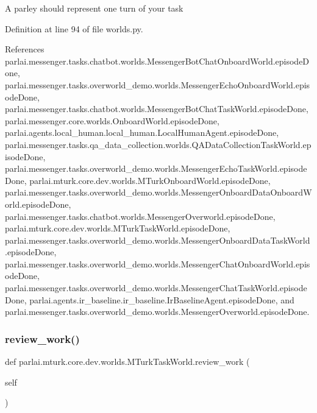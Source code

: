 \begin{DoxyVerb}A parley should represent one turn of your task\end{DoxyVerb}
 

Definition at line 94 of file worlds.\+py.



References parlai.\+messenger.\+tasks.\+chatbot.\+worlds.\+Messenger\+Bot\+Chat\+Onboard\+World.\+episode\+Done, parlai.\+messenger.\+tasks.\+overworld\+\_\+demo.\+worlds.\+Messenger\+Echo\+Onboard\+World.\+episode\+Done, parlai.\+messenger.\+tasks.\+chatbot.\+worlds.\+Messenger\+Bot\+Chat\+Task\+World.\+episode\+Done, parlai.\+messenger.\+core.\+worlds.\+Onboard\+World.\+episode\+Done, parlai.\+agents.\+local\+\_\+human.\+local\+\_\+human.\+Local\+Human\+Agent.\+episode\+Done, parlai.\+messenger.\+tasks.\+qa\+\_\+data\+\_\+collection.\+worlds.\+Q\+A\+Data\+Collection\+Task\+World.\+episode\+Done, parlai.\+messenger.\+tasks.\+overworld\+\_\+demo.\+worlds.\+Messenger\+Echo\+Task\+World.\+episode\+Done, parlai.\+mturk.\+core.\+dev.\+worlds.\+M\+Turk\+Onboard\+World.\+episode\+Done, parlai.\+messenger.\+tasks.\+overworld\+\_\+demo.\+worlds.\+Messenger\+Onboard\+Data\+Onboard\+World.\+episode\+Done, parlai.\+messenger.\+tasks.\+chatbot.\+worlds.\+Messenger\+Overworld.\+episode\+Done, parlai.\+mturk.\+core.\+dev.\+worlds.\+M\+Turk\+Task\+World.\+episode\+Done, parlai.\+messenger.\+tasks.\+overworld\+\_\+demo.\+worlds.\+Messenger\+Onboard\+Data\+Task\+World.\+episode\+Done, parlai.\+messenger.\+tasks.\+overworld\+\_\+demo.\+worlds.\+Messenger\+Chat\+Onboard\+World.\+episode\+Done, parlai.\+messenger.\+tasks.\+overworld\+\_\+demo.\+worlds.\+Messenger\+Chat\+Task\+World.\+episode\+Done, parlai.\+agents.\+ir\+\_\+baseline.\+ir\+\_\+baseline.\+Ir\+Baseline\+Agent.\+episode\+Done, and parlai.\+messenger.\+tasks.\+overworld\+\_\+demo.\+worlds.\+Messenger\+Overworld.\+episode\+Done.

\mbox{\label{classparlai_1_1mturk_1_1core_1_1dev_1_1worlds_1_1MTurkTaskWorld_a9128507c0a4ae977faf779690462ab37}} 
\subsubsection{\texorpdfstring{review\+\_\+work()}{review\_work()}}
{\footnotesize\ttfamily def parlai.\+mturk.\+core.\+dev.\+worlds.\+M\+Turk\+Task\+World.\+review\+\_\+work (\begin{DoxyParamCaption}\item[{}]{self }\end{DoxyParamCaption})}

